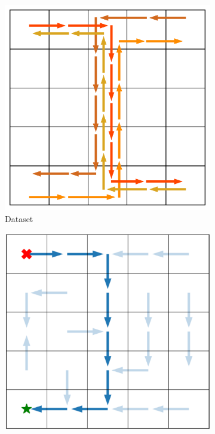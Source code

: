 \documentclass{article} %
\begin{document}
\begin{figure}[t]
    \centering
    \vspace{-1.5em}
    \begin{minipage}{0.48\textwidth}
        \begin{subfigure}[c]{0.32\linewidth}
        \centering
            \includegraphics[width=\linewidth]{figures/policy_analysis/stitching_dataset.pdf}
            \caption*{Dataset}
        \end{subfigure}
        \begin{subfigure}[c]{0.32\linewidth}
            \includegraphics[width=\linewidth]{figures/policy_analysis/stitching_td_infonce.pdf}

\end{subfigure}
\end{minipage}
\end{figure}
\end{document}
